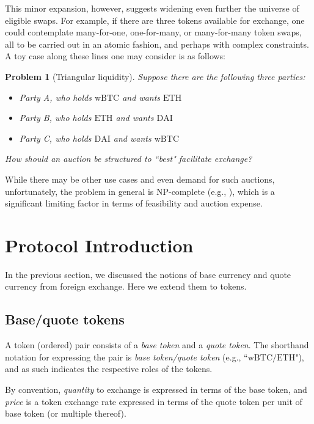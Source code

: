 \documentclass[11pt, reqno]{amsart}
\newtheorem{problem}[thm]{Problem}
\newcommand{\BTC}{\mathrm{wBTC}}
\newcommand{\ETH}{\mathrm{ETH}}
\newcommand{\DAI}{\mathrm{DAI}}
\begin{document}
This minor expansion, however, suggests widening even further the universe of
eligible swaps. For example, if there are three tokens available for exchange,
one could contemplate many-for-one, one-for-many, or many-for-many token swaps,
all to be carried out in an atomic fashion, and perhaps with complex
constraints. A toy case along these lines one may consider is as follows:
\begin{problem}[Triangular liquidity]
Suppose there are the following three parties:
\begin{itemize}
	\item Party A, who holds $\BTC$ and wants $\ETH$
	\item Party B, who holds $\ETH$ and wants $\DAI$
	\item Party C, who holds $\DAI$ and wants $\BTC$
\end{itemize}
How should an auction be structured to ``best" facilitate exchange?
\end{problem}
While there may be other use cases and even demand for such auctions,
unfortunately, the problem in general is NP-complete (e.g., \cite{XiStWh05}),
which is a significant limiting factor in terms of feasibility and
auction expense.


\section{Protocol Introduction}
In the previous section, we discussed the notions of base currency and
quote currency from foreign exchange. Here we extend them to tokens.

\subsection{Base/quote tokens}
A token (ordered) pair consists of a \emph{base token} and a
\emph{quote token}. The shorthand notation for expressing the pair is
\emph{base token/quote token} (e.g., ``$\BTC/\ETH$"), and as such indicates the
respective roles of the tokens.

By convention, \emph{quantity} to exchange is expressed in terms of the base
token, and \emph{price} is a token exchange rate expressed in terms of the
quote token per unit of base token (or multiple thereof).
\end{document}
